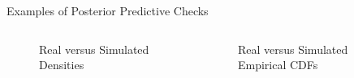 \begin{frame}{Examples of Posterior Predictive Checks}
	\begin{columns}
		\begin{column}{0.5\textwidth}
			\begin{figure}
				\centering
				\resizebox{0.8\columnwidth}{!}{}
				\caption{Real versus Simulated Densities}
			\end{figure}
		\end{column}
		\begin{column}{0.5\textwidth}
			\begin{figure}
				\centering
				\resizebox{0.8\columnwidth}{!}{}
				\caption{Real versus Simulated Empirical CDFs}
			\end{figure}
		\end{column}
	\end{columns}
\end{frame}

